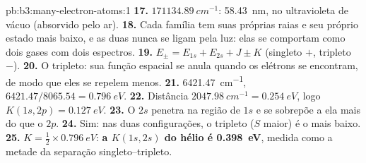 \begin{solution}{pb:b3:many-electron-atoms:1}
\textbf{17.} $\qty{171134.89}{cm^{-1}}$: \qty{58.43}{nm}, no ultravioleta de
vácuo (absorvido pelo ar).
\textbf{18.} Cada família tem suas próprias raias e seu próprio estado mais baixo,
e as duas nunca se ligam pela luz: elas se comportam como dois gases com dois espectros.
\textbf{19.} $E_\pm = E_{1s} + E_{2s} + J \pm K$ (singleto $+$, tripleto $-$).
\textbf{20.} O tripleto: sua função espacial se anula quando os elétrons se
encontram, de modo que eles se repelem menos.
\textbf{21.} \qty{6421.47}{cm^{-1}}, $6421.47/8065.54 = \qty{0.796}{eV}$.
\textbf{22.} Distância $\qty{2047.98}{cm^{-1}} = \qty{0.254}{eV}$, logo $K(1s,2p) =
\qty{0.127}{eV}$.
\textbf{23.} O $2s$ penetra na região de $1s$ e se sobrepõe a ela mais do que
o $2p$.
\textbf{24.} Sim: nas duas configurações, o tripleto ($S$ maior) é o mais baixo.
\textbf{25.} $K = \frac12 \times \qty{0.796}{eV}$: \textbf{a 
$K(1s,2s)$ do hélio é \qty{0.398}{eV}}, medida como a metade da
separação singleto--tripleto.
\end{solution}
